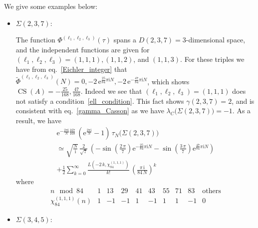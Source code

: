 \documentclass[12pt,reqno]{amsart}
\numberwithin{equation}{section}
\DeclareMathOperator{\CS}{CS}
\begin{document}
We give some examples below:
\begin{itemize}
\item $\Sigma(2,3,7)$:

  The function  $\Phi^{(\ell_1, \ell_2, \ell_3)}(\tau)$ spans
  a $D(2,3,7)=3$-dimensional space, and the independent functions
  are given for
  $(\ell_1, \ell_2, \ell_3)=(1,1,1), (1,1,2)$, and $(1,1,3)$.
  For these triples 
  we have  from
  eq.~\eqref{Eichler_integer}
  that
  $\widetilde{\Phi}^{(\ell_1, \ell_2, \ell_3)}(N)
  =0,
  -2 \, \mathrm{e}^{\frac{25}{84} \pi \mathrm{i} N},
  -2 \, \mathrm{e}^{-\frac{47}{84} \pi \mathrm{i} N}
  $,
  which shows 
  $\CS(A)=-\frac{25}{168},
  \frac{47}{168}$.
  Indeed  we see that
  $(\ell_1,\ell_2,\ell_3)=
  (1,1,1)$ does not satisfy a condition~\eqref{ell_condition}.
  This fact shows
  $\gamma(2,3,7)=2$, and
  is consistent with eq.~\eqref{gamma_Casson} as we have
  $\lambda_C\bigl( \Sigma(2,3,7) \bigr)=-1$.
  As a result, we have
  \begin{multline*}
    \mathrm{e}^{
      - \frac{2 \pi \mathrm{i}}{N}
      \frac{167}{168} 
    } \,
    \left(
      \mathrm{e}^{\frac{2 \pi \mathrm{i}}{N}} - 1
    \right)
    \,    \tau_N \bigl( \Sigma(2,3,7) \bigr)
    \\
    \simeq
    \sqrt{\frac{N}{ \mathrm{i} }} \,
    \frac{2}{\sqrt{7}} \,
    \left(
      - \sin \left(     \frac{2 \, \pi }{7}  \right)
      \mathrm{e}^{- \frac{25}{84} \pi \mathrm{i}  N}
      -
      \sin \left(     \frac{3 \, \pi }{7}  \right)
      \mathrm{e}^{ \frac{47}{84} \pi \mathrm{i}  N}
    \right)
    \\
    + \frac{1}{2} \sum_{k=0}^\infty
    \frac{L(-2 \, k , \chi_{84}^{(1,1,1)})}{k!}
    \,
    \left(
      \frac{\pi \, \mathrm{i}}{
        84 \, N
      }
    \right)^k
  \end{multline*}
  where
  \begin{equation*}
    \begin{array}{c||ccccccccc}
      n \mod 84 &
      1 & 13 & 29 & 41 & 43 & 55 & 71 & 83 &
      \text{others}
      \\
      \hline
      \chi_{84}^{(1,1,1)}(n)
      & 1 & -1 &-1 & 1 & -1 & 1 & 1 & -1 & 0
    \end{array}
  \end{equation*}

\item $\Sigma(3,4,5)$:


\end{itemize}
\end{document}
